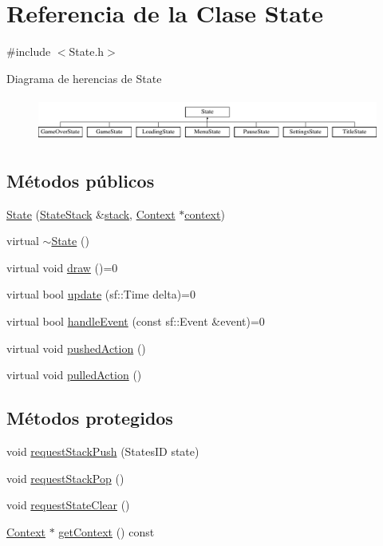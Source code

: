 \hypertarget{classState}{}\section{Referencia de la Clase State}
\label{classState}


{\ttfamily \#include $<$State.\+h$>$}

Diagrama de herencias de State\begin{figure}[H]
\begin{center}
\leavevmode
\includegraphics[height=1.467890cm]{classState}
\end{center}
\end{figure}
\subsection*{Métodos públicos}
\begin{DoxyCompactItemize}
\item 
\hyperlink{classState_ae4dcb70a7ad6a1bfe13fcda87600806d}{State} (\hyperlink{classStateStack}{State\+Stack} \&\hyperlink{classState_a86c8d3a5a1ee89896828be85a785fb04}{stack}, \hyperlink{classContext}{Context} $\ast$\hyperlink{classState_adc93e8ad3199b5891618ca88eed0436a}{context})
\item 
virtual \hyperlink{classState_afab438d92b90dc18d194dbd9c9c8bab3}{$\sim$\+State} ()
\item 
virtual void \hyperlink{classState_ae261605bc40b7e3959ce5df5457e4942}{draw} ()=0
\item 
virtual bool \hyperlink{classState_aa6366828eb50639e86b94008cfad9c5d}{update} (sf\+::\+Time delta)=0
\item 
virtual bool \hyperlink{classState_a19965f83460b248c42952aac8d001206}{handle\+Event} (const sf\+::\+Event \&event)=0
\item 
virtual void \hyperlink{classState_a3cc6a1378f32f9ed6a2d1d8140296808}{pushed\+Action} ()
\item 
virtual void \hyperlink{classState_a92620c4648de675037b20ec59edb52a3}{pulled\+Action} ()
\end{DoxyCompactItemize}
\subsection*{Métodos protegidos}
\begin{DoxyCompactItemize}
\item 
void \hyperlink{classState_a0560458d8f71d6fc0e239e726552ea26}{request\+Stack\+Push} (States\+I\+D state)
\item 
void \hyperlink{classState_aa418660892d6161772c907bd8d70f910}{request\+Stack\+Pop} ()
\item 
void \hyperlink{classState_a4b602bed9bf0179ee5f6748fce340ae6}{request\+State\+Clear} ()
\item 
\hyperlink{classContext}{Context} $\ast$ \hyperlink{classState_ab08e1a541e46b2335c92ecbafe369df5}{get\+Context} () const 
\end{DoxyCompactItemize}
